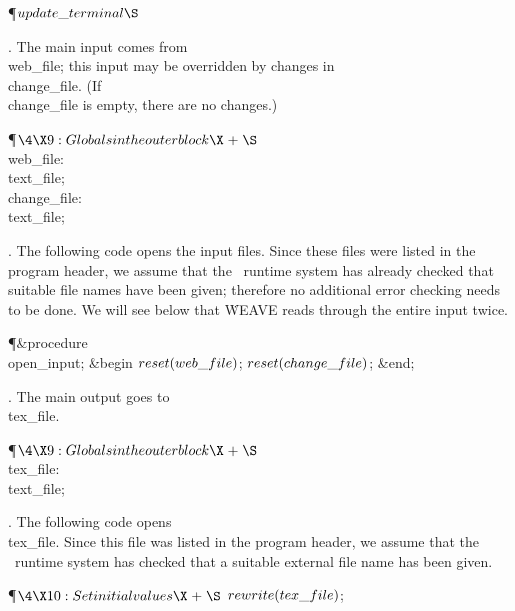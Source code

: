 \Y\P\D {}$\\{update\_terminal}\S$\par
\fi

. The main input comes from \\{web\_file}; this input may be overridden
by changes in \\{change\_file}. (If \\{change\_file} is empty, there are no
changes.)

\Y\P$\4\X9:Globals in the outer block\X\mathrel{+}\S$\6
\4\\{web\_file}: \\{text\_file};\6
\4\\{change\_file}: \\{text\_file};\par
\fi

. The following code opens the input files.  Since these files were listed
in the program header, we assume that the \PASCAL\ runtime system has
already checked that suitable file names have been given; therefore no
additional error checking needs to be done. We will see below that
\.{WEAVE} reads through the entire input twice.

\Y\P\4\&{procedure}\1\  \\{open\_input};\2\6
\&{begin} $\\{reset}(\\{web\_file})$;\5
$\\{reset}(\\{change\_file})$;\6
\&{end};\par
\fi

. The main output goes to \\{tex\_file}.

\Y\P$\4\X9:Globals in the outer block\X\mathrel{+}\S$\6
\4\\{tex\_file}: \\{text\_file};\par
\fi

. The following code opens \\{tex\_file}.
Since this file was listed in the program header, we assume that the
\PASCAL\ runtime system has checked that a suitable external file name has
been given.

\Y\P$\4\X10:Set initial values\X\mathrel{+}\S$\6
$\\{rewrite}(\\{tex\_file})$;\par
\fi

